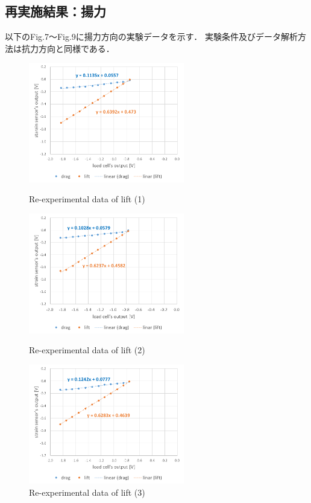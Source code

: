 \documentclass[twocolumn,a4j]{jsarticle}
\begin{document}
\newpage

\subsection{再実施結果：揚力}
以下のFig.7～Fig.9に揚力方向の実験データを示す．
実験条件及びデータ解析方法は抗力方向と同様である．
\begin{figure}[htbp]
    \footnotesize
    \begin{center}
        \includegraphics[width=68mm]{../images/graph_21119_lift_1.png}
        \caption{Re-experimental data of lift (1)}
        \includegraphics[width=68mm]{../images/graph_21119_lift_2.png}
        \caption{Re-experimental data of lift (2)}
        \includegraphics[width=68mm]{../images/graph_21119_lift_3.png}
        \caption{Re-experimental data of lift (3)}
    \end{center}
\end{figure}

\newpage
\end{document}
